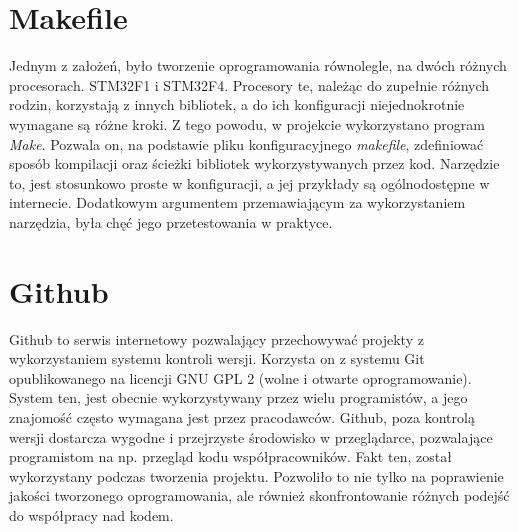 \section{Makefile}
Jednym z założeń, było tworzenie oprogramowania równolegle, na dwóch różnych procesorach. STM32F1 i STM32F4. Procesory te, należąc do zupełnie różnych rodzin, korzystają z innych bibliotek, a do ich konfiguracji niejednokrotnie wymagane są różne kroki. Z tego powodu, w projekcie wykorzystano program \emph{Make}. Pozwala on, na podstawie pliku konfiguracyjnego \emph{makefile}, zdefiniować sposób kompilacji oraz ścieżki bibliotek wykorzystywanych przez kod. Narzędzie to, jest stosunkowo proste w konfiguracji, a jej przykłady są ogólnodostępne w internecie. Dodatkowym argumentem przemawiającym za wykorzystaniem narzędzia, była chęć jego przetestowania w praktyce.

\section{Github}
Github to serwis internetowy pozwalający przechowywać projekty z wykorzystaniem systemu kontroli wersji. Korzysta on z systemu Git opublikowanego na licencji GNU GPL 2 (wolne i otwarte oprogramowanie). System ten, jest obecnie wykorzystywany przez wielu programistów, a jego znajomość często wymagana jest przez pracodawców. Github, poza kontrolą wersji dostarcza wygodne i przejrzyste środowisko w przeglądarce, pozwalające programistom na np. przegląd kodu współpracowników. Fakt ten, został wykorzystany podczas tworzenia projektu. Pozwoliło to nie tylko na poprawienie jakości tworzonego oprogramowania, ale również skonfrontowanie różnych podejść do współpracy nad kodem.
